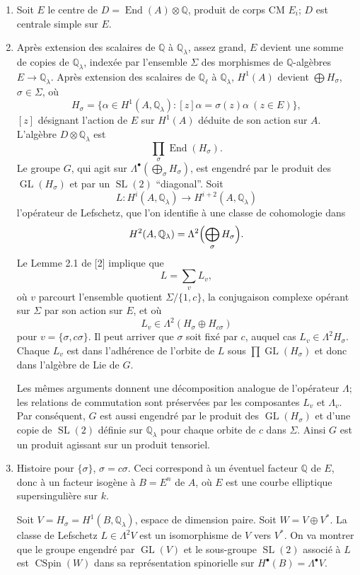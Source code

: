 \documentclass[11pt]{article}
\newcommand{\Q}{\mathbb Q}
\newcommand{\End}{\operatorname{End}}
\newcommand{\GL}{\operatorname{GL}}
\newcommand{\SL}{\operatorname{SL}}
\newcommand{\CSpin}{\operatorname{CSpin}}
\theoremstyle{deligne}
\begin{document}
\begin{enumerate}[label=(\alph*)]
\item Soit $E$ le centre de $D=\End(A)\otimes\Q$, produit de corps CM $E_i$; $D$ est centrale simple sur $E$.
\item Après extension des scalaires de $\Q$ à $\Q_\lambda$, assez grand, $E$ devient une somme de copies de $\Q_\lambda$, indexée par l'ensemble $\Sigma$ des morphismes de $\Q$-algèbres $E\to\Q_\lambda$. Après extension des scalaires de $\Q_\ell$ à $\Q_\lambda$, $H^1(A)$ devient $\bigoplus H_\sigma$, $\sigma\in\Sigma$, où
\[
H_\sigma=\{\alpha\in H^1(A,\Q_\lambda):[z]\alpha=\sigma(z)\alpha\ (z\in E)\},
\]
$[z]$ désignant l'action de $E$ sur $H^1(A)$ déduite de son action sur $A$. L'algèbre $D\otimes\Q_\lambda$ est
\[
\prod_\sigma \End(H_\sigma).
\]
Le groupe $G$, qui agit sur $\Lambda^\bullet(\bigoplus_\sigma H_\sigma)$, est engendré par le produit des $\GL(H_\sigma)$ et par un $\SL(2)$ ``diagonal''. Soit
\[
L:H^i(A,\Q_\lambda)\longrightarrow H^{i+2}(A,\Q_\lambda)
\]
l'opérateur de Lefschetz, que l'on identifie à une classe de cohomologie dans
\[
H^2(A,\Q_\lambda)=\Lambda^2\Bigl(\bigoplus_\sigma H_\sigma\Bigr).
\]
Le Lemme 2.1 de [2] implique que
\[
L=\sum_v L_v,
\]
où $v$ parcourt l'ensemble quotient $\Sigma/\{1,c\}$, la conjugaison complexe opérant sur $\Sigma$ par son action sur $E$, et où
\[
L_v\in\Lambda^2(H_\sigma\oplus H_{c\sigma})
\]
pour $v=\{\sigma,c\sigma\}$. Il peut arriver que $\sigma$ soit fixé par $c$, auquel cas $L_v\in\Lambda^2H_\sigma$. Chaque $L_v$ est dans l'adhérence de l'orbite de $L$ sous $\prod\GL(H_\sigma)$ et donc dans l'algèbre de Lie de $G$.

Les mêmes arguments donnent une décomposition analogue de l'opérateur $\Lambda$; les relations de commutation sont préservées par les composantes $L_v$ et $\Lambda_v$. Par conséquent, $G$ est aussi engendré par le produit des $\GL(H_\sigma)$ et d'une copie de $\SL(2)$ définie sur $\Q_\lambda$ pour chaque orbite de $c$ dans $\Sigma$. Ainsi $G$ est un produit agissant sur un produit tensoriel.

\item Histoire pour $\{\sigma\}$, $\sigma=c\sigma$. Ceci correspond à un éventuel facteur $\Q$ de $E$, donc à un facteur isogène à $B=E^n$ de $A$, où $E$ est une courbe elliptique supersingulière sur $k$.

Soit $V=H_\sigma=H^1(B,\Q_\lambda)$, espace de dimension paire. Soit $W=V\oplus V^*$. La classe de Lefschetz $L\in\Lambda^2V$ est un isomorphisme de $V$ vers $V^*$. On va montrer que le groupe engendré par $\GL(V)$ et le sous-groupe $\SL(2)$ associé à $L$ est $\CSpin(W)$ dans sa représentation spinorielle sur $H^\bullet(B)=\Lambda^\bullet V$.


\end{enumerate}
\end{document}
